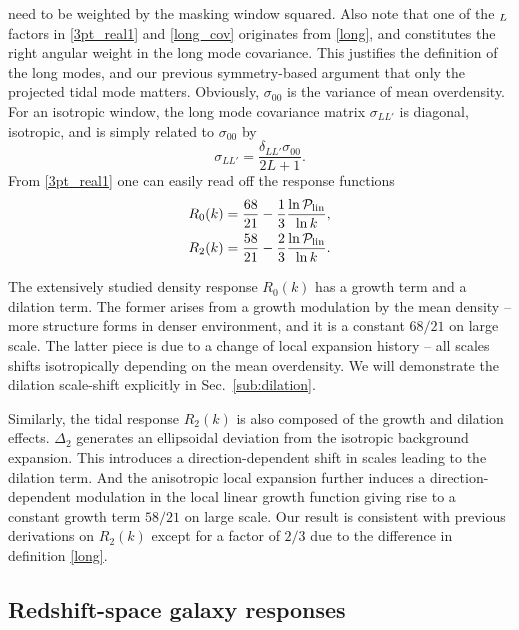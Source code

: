 \documentclass[a4paper,11pt]{article}
\let\d\relax
\DeclareMathOperator{\d}{d}
\let\L\relax
\DeclareMathOperator{\L}{\mathcal{L}}
\newcommand{\Pdimless}{\mathcal{P}}
\newcommand{\Dlin}{\frac{\d\ln\Pdimless_\lin}{\d\ln k}}
\newcommand{\lin}{\mathrm{lin}}
\begin{document}
need to be weighted by the masking window squared.
Also note that one of the $\L_L$ factors in \eqref{3pt_real1} and
\eqref{long_cov} originates from \eqref{long}, and constitutes the right
angular weight in the long mode covariance.
This justifies the definition of the long modes, and our previous
symmetry-based argument that only the projected tidal mode matters.
Obviously, $\sigma_{00}$ is the variance of mean overdensity.
For an isotropic window, the long mode covariance matrix $\sigma_{LL'}$ is diagonal, isotropic,
and is simply related to $\sigma_{00}$ by
\begin{equation}
    \label{long_cov_iso}
    \sigma_{LL'} = \frac{\delta_{LL'}\sigma_{00}}{2L+1}.
\end{equation}
From \eqref{3pt_real1} one can easily read off the response functions
\begin{align}
    \label{R0R2}
    R_0(k) &= \frac{68}{21} - \frac13 \Dlin, \nonumber\\
    R_2(k) &= \frac{58}{21} - \frac23 \Dlin.
\end{align}

The extensively studied density response $R_0(k)$ has a growth term and a
dilation term.
The former arises from a growth modulation by the mean density -- more
structure forms in denser environment, and it is a constant $68/21$ on large
scale.
The latter piece is due to a change of local expansion history -- all
scales shifts isotropically depending on the mean overdensity.
We will demonstrate the dilation scale-shift explicitly in Sec.~\ref{sub:dilation}.

Similarly, the tidal response $R_2(k)$ is also composed of the growth and
dilation effects.
$\Delta_2$ generates an ellipsoidal deviation from the isotropic background
expansion.
This introduces a direction-dependent shift in scales leading to the dilation
term.
And the anisotropic local expansion further induces a direction-dependent
modulation in the local linear growth function giving rise to a constant growth
term $58/21$ on large scale.
Our result is consistent with previous derivations \cite{SchmidtPajerEtAl14,
AkitsuTakadaEtAl17} on $R_2(k)$ except for a factor of $2/3$ due to the
difference in definition \eqref{long}.



\subsection{Redshift-space galaxy responses}
\label{sub:resp_red}
\end{document}
